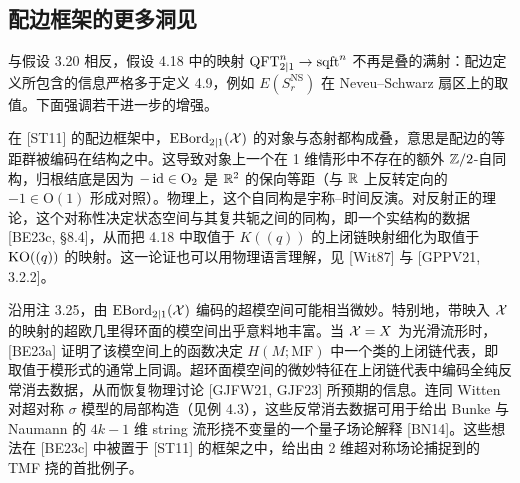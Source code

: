 \subsection{配边框架的更多洞见}
与假设 3.20 相反，假设 4.18 中的映射 $\operatorname{QFT}^n_{2|1}\to\operatorname{sqft}^n$ 不再是叠的满射：配边定义所包含的信息严格多于定义 4.9，例如 $E(S^{\mathrm{NS}}_r)$ 在 Neveu–Schwarz 扇区上的取值。下面强调若干进一步的增强。

\begin{example}[4.19（实结构）]
在 [ST11] 的配边框架中，$\operatorname{EBord}_{2|1}(\mathcal{X})$ 的对象与态射都构成叠，意思是配边的等距群被编码在结构之中。这导致对象上一个在 1 维情形中不存在的额外 $\mathbb{Z}/2$-自同构，归根结底是因为 $-\operatorname{id}\in\mathrm{O}_2$ 是 $\mathbb{R}^2$ 的保向等距（与 $\mathbb{R}$ 上反转定向的 $-1\in\mathrm{O}(1)$ 形成对照）。物理上，这个自同构是宇称–时间反演。对反射正的理论，这个对称性决定状态空间与其复共轭之间的同构，即一个实结构的数据 [BE23c, §8.4]，从而把 4.18 中取值于 $K((q))$ 的上闭链映射细化为取值于 $\mathrm{KO}((q))$ 的映射。这一论证也可以用物理语言理解，见 [Wit87] 与 [GPPV21, 3.2.2]。
\end{example}

\begin{example}[4.20（场论的挠不变量）]
沿用注 3.25，由 $\operatorname{EBord}_{2|1}(\mathcal{X})$ 编码的超模空间可能相当微妙。特别地，带映入 $\mathcal{X}$ 的映射的超欧几里得环面的模空间出乎意料地丰富。当 $\mathcal{X}=X$ 为光滑流形时，[BE23a] 证明了该模空间上的函数决定 $H(M;\mathrm{MF})$ 中一个类的上闭链代表，即取值于模形式的通常上同调。超环面模空间的微妙特征在上闭链代表中编码全纯反常消去数据，从而恢复物理讨论 [GJFW21, GJF23] 所预期的信息。连同 Witten 对超对称 $\sigma$ 模型的局部构造（见例 4.3），这些反常消去数据可用于给出 Bunke 与 Naumann 的 $4k-1$ 维 string 流形挠不变量的一个量子场论解释 [BN14]。这些想法在 [BE23c] 中被置于 [ST11] 的框架之中，给出由 2 维超对称场论捕捉到的 TMF 挠的首批例子。
\end{example}


